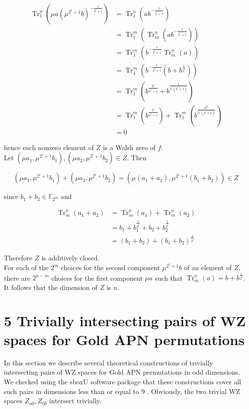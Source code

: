 \documentclass[10pt]{article}
\begin{document}
$$
\begin{aligned}
\operatorname{Tr}_{1}^{n}\left(\mu a\left(\mu^{2^{i}+1} b\right)^{-\frac{1}{2^{i}+1}}\right) & =\operatorname{Tr}_{1}^{n}\left(a b^{-\frac{1}{2^{i}+1}}\right) \\
& =\operatorname{Tr}_{1}^{m}\left(\operatorname{Tr}_{m}^{n}\left(a b^{-\frac{1}{2^{i}+1}}\right)\right) \\
& =\operatorname{Tr}_{1}^{m}\left(b^{-\frac{1}{2^{i}+1}} \operatorname{Tr}_{m}^{n}(a)\right) \\
& =\operatorname{Tr}_{1}^{m}\left(b^{-\frac{1}{2^{i}+1}}\left(b+b^{\frac{1}{2^{i}}}\right)\right) \\
& =\operatorname{Tr}_{1}^{m}\left(b^{\frac{2^{i}}{2^{i}+1}}+b^{\frac{1}{2^{i}\left(2^{i}+1\right)}}\right) \\
& =\operatorname{Tr}_{1}^{m}\left(b^{\frac{2^{i}}{2^{i}+1}}\right)+\operatorname{Tr}_{1}^{m}\left(b^{\frac{2^{2 i}}{2^{i}\left(2^{i}+1\right)}}\right) \\
& =0
\end{aligned}
$$

hence each nonzero element of $Z$ is a Walsh zero of $f$.\\
Let $\left(\mu a_{1}, \mu^{2^{i}+1} b_{1}\right),\left(\mu a_{2}, \mu^{2^{i}+1} b_{2}\right) \in Z$. Then

$$
\left(\mu a_{1}, \mu^{2^{i}+1} b_{1}\right)+\left(\mu a_{2}, \mu^{2^{i}+1} b_{2}\right)=\left(\mu\left(a_{1}+a_{2}\right), \mu^{2^{i}+1}\left(b_{1}+b_{2}\right)\right) \in Z
$$

since $b_{1}+b_{2} \in \mathbb{F}_{2^{m}}$ and

$$
\begin{aligned}
\operatorname{Tr}_{m}^{n}\left(a_{1}+a_{2}\right) & =\operatorname{Tr}_{m}^{n}\left(a_{1}\right)+\operatorname{Tr}_{m}^{n}\left(a_{2}\right) \\
& =b_{1}+b_{1}^{\frac{1}{2^{i}}}+b_{2}+b_{2}^{\frac{1}{2^{i}}} \\
& =\left(b_{1}+b_{2}\right)+\left(b_{1}+b_{2}\right)^{\frac{1}{2^{i}}}
\end{aligned}
$$

Therefore $Z$ is additively closed.\\
For each of the $2^{m}$ choices for the second component $\mu^{2^{i}+1} b$ of an element of $Z$, there are $2^{n-m}$ choices for the first component $\mu a$ such that $\operatorname{Tr}_{m}^{n}(a)= b+b^{\frac{1}{2^{i}}}$. It follows that the dimension of $Z$ is $n$.

\section*{5 Trivially intersecting pairs of WZ spaces for Gold APN permutations}
In this section we describe several theoretical constructions of trivially intersecting pairs of WZ spaces for Gold APN permutations in odd dimensions. We checked using the sboxU software package that these constructions cover all such pairs in dimensions less than or equal to 9 . Obviously, the two trivial WZ spaces $Z_{a 0}, Z_{0 b}$ intersect trivially.
\end{document}
